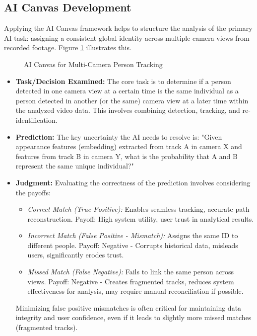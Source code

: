 \subsection{AI Canvas Development}
\label{subsection:ai_canvas_dev_aic}
Applying the AI Canvas framework helps to structure the analysis of the primary AI task: assigning a consistent global identity across multiple camera views from recorded footage.
Figure \ref{fig:ai_canvas} illustrates this.
\begin{figure}[!htb]
    \centering
    \caption{AI Canvas for Multi-Camera Person Tracking}
    \label{fig:ai_canvas}
\end{figure}
\clearpage
\begin{itemize}
    \item \textbf{Task/Decision Examined:} The core task is to determine if a person detected in one camera view at a certain time is the same individual as a person detected in another (or the same) camera view at a later time within the analyzed video data. This involves combining detection, tracking, and re-identification.
    \item \textbf{Prediction:} The key uncertainty the AI needs to resolve is: "Given appearance features (embedding) extracted from track A in camera X and features from track B in camera Y, what is the probability that A and B represent the same unique individual?"

    \item \textbf{Judgment:} Evaluating the correctness of the prediction involves considering the payoffs:
        \begin{itemize}
            \item \textit{Correct Match (True Positive):} Enables seamless tracking, accurate path reconstruction. Payoff: High system utility, user trust in analytical results.
            \item \textit{Incorrect Match (False Positive - Mismatch):} Assigns the same ID to different people. Payoff: Negative - Corrupts historical data, misleads users, significantly erodes trust.
            \item \textit{Missed Match (False Negative):} Fails to link the same person across views. Payoff: Negative - Creates fragmented tracks, reduces system effectiveness for analysis, may require manual reconciliation if possible.
        \end{itemize}
        Minimizing false positive mismatches is often critical for maintaining data integrity and user confidence, even if it leads to slightly more missed matches (fragmented tracks).


\end{itemize}
